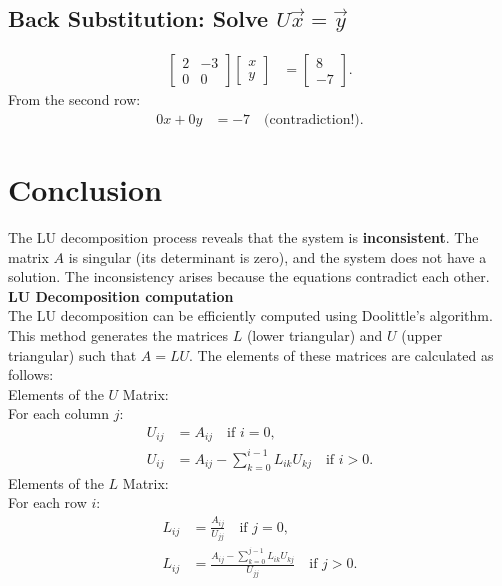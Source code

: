 \documentclass[journal]{IEEEtran}
\begin{document}
\subsection*{Back Substitution: Solve \(U \vec{x} = \vec{y}\)}
\begin{align}
    \begin{bmatrix} 2 & -3 \\ 0 & 0 \end{bmatrix}
    \begin{bmatrix} x \\ y \end{bmatrix} &=
    \begin{bmatrix} 8 \\ -7 \end{bmatrix}.
\end{align}
From the second row:
\begin{align}
    0x + 0y &= -7 \quad \text{(contradiction!)}.
\end{align}

\section*{Conclusion}
The LU decomposition process reveals that the system is \textbf{inconsistent}. The matrix \(A\) is singular (its determinant is zero), and the system does not have a solution. The inconsistency arises because the equations contradict each other.\\
\textbf{LU Decomposition computation}\\
The LU decomposition can be efficiently computed using Doolittle's algorithm. This method generates the matrices \( L \) (lower triangular) and \( U \) (upper triangular) such that \( A = LU \). The elements of these matrices are calculated as follows: \\
Elements of the \( U \) Matrix:  \\
For each column \( j \):
\begin{align}
	U_{ij} &= A_{ij} \quad \text{if } i = 0, \\
	U_{ij} &= A_{ij} - \sum_{k=0}^{i-1} L_{ik} U_{kj} \quad \text{if } i > 0.
\end{align}
Elements of the \( L \) Matrix: \\
For each row \( i \):
\begin{align}
	L_{ij} &= \frac{A_{ij}}{U_{jj}} \quad \text{if } j = 0, \\
	L_{ij} &= \frac{A_{ij} - \sum_{k=0}^{j-1} L_{ik} U_{kj}}{U_{jj}} \quad \text{if } j > 0.
\end{align}
\end{document}

